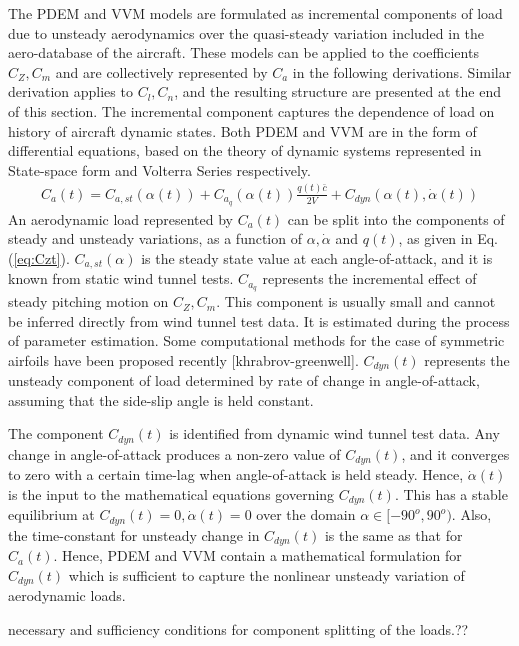 \documentclass{AIAA}
\begin{document}
The PDEM and VVM models are formulated as incremental components of load due to unsteady aerodynamics over the quasi-steady variation included in the aero-database of the aircraft. These models can be applied to the coefficients $C_Z, C_m$ and are collectively represented by $C_a$ in the following derivations. Similar derivation applies to $C_l, C_n$, and the resulting structure are presented at the end of this section. The incremental component captures the dependence of load on history of aircraft dynamic states. Both PDEM and VVM are in the form of differential equations, based on the theory of dynamic systems represented in State-space form and Volterra Series respectively. 
\begin{eqnarray}
\label{eq:Czt}
C_a(t) = C_{a,st}(\alpha (t))+ C_{a_q}(\alpha (t))\frac{q(t) \bar{c}}{2V} + C_{dyn}(\alpha (t), \dot{\alpha}(t))
\end{eqnarray}
An aerodynamic load represented by $C_a(t)$ can be split into the components of steady and unsteady variations, as a function of $\alpha,\dot{\alpha}$ and $q(t)$, as given in Eq.(\ref{eq:Czt}). $C_{a,st}(\alpha)$ is the steady state value at each angle-of-attack, and it is known from static wind tunnel tests. $C_{a_q}$ represents the incremental effect of steady pitching motion on $C_Z, C_m$. This component is usually small and cannot be inferred directly from wind tunnel test data. It is estimated during the process of parameter estimation. Some computational methods for the case of symmetric airfoils have been proposed recently [khrabrov-greenwell]. $C_{dyn}(t)$ represents the unsteady component of load determined by rate of change in angle-of-attack, assuming that the side-slip angle is held constant.

The component $C_{dyn}(t)$ is identified from dynamic wind tunnel test data. Any change in angle-of-attack produces a non-zero value of $C_{dyn}(t)$, and it converges to zero with a certain time-lag when angle-of-attack is held steady. Hence, $\dot{\alpha}(t)$ is the input to the mathematical equations governing $C_{dyn}(t)$. This  has a stable equilibrium at $C_{dyn}(t)=0,\dot{\alpha}(t)=0$ over the domain $\alpha \in [-90^o,90^o)$. Also, the time-constant for unsteady change in $C_{dyn}(t)$ is the same as that for $C_a(t)$. Hence, PDEM and VVM contain a mathematical formulation for $C_{dyn}(t)$ which is sufficient to capture the nonlinear unsteady variation of aerodynamic loads.

necessary and sufficiency conditions for component splitting of the loads.??
\end{document}
